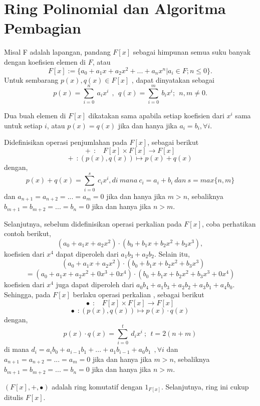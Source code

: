 \chapter{Ring Polinomial dan Algoritma Pembagian}
	Misal F adalah lapangan, pandang $F[x]$ sebagai himpunan semua suku banyak dengan koefisien elemen di $F$, atau
		$$ F[x]	:= \big\{ a_0 + a_1x + a_2x^2 + ... + a_nx^n | a_i \in F; n \le 0 \big\}. $$
	Untuk sembarang $ p(x), q(x) \in F[x]$ , dapat dinyatakan sebagai
	$$ p(x) = \sum^{n}_{i=0} \ a_ix^i ~~,~~q(x) = \sum^{m}_{i=0} \ b_ix^i   ;~~   n,m \ne 0. $$
\par Dua buah elemen di $F[x]$ dikatakan sama apabila setiap koefisien dari $x^i$ sama untuk setiap $i$, atau $p(x) = q(x)$ jika dan hanya jika $a_i = b_i , \forall i$.
\par 	Didefinisikan operasi penjumlahan pada $F[x]$, sebagai berikut
	$$ +	~~:~~~~F[x] \times F[x] \longrightarrow F[x]$$
	$$ + ~~:(p(x),q(x)) \mapsto p(x) + q(x)$$
	dengan, $$p(x) + q(x) = \sum^{s}_{i=0} \ c_ix^i , di~mana~ c_i = a_i + b_i ~dan~ s =max\{n,m\}$$
	dan $a_{n+1} = a_{n+2} = ... = a_m = 0 $ jika dan hanya jika $m>n$, sebaliknya $b_{m+1} = b_{m+2} = ... = b_n = 0 $ jika dan hanya jika $n>m$.
\par 	Selanjutnya, sebelum didefinisikan operasi perkalian pada $F[x]$, coba perhatikan contoh berikut,
	 $$(a_0+a_1x+a_2x^2) \cdot (b_0+b_1x+b_2x^2+b_3x^3),$$
	koefisien dari $x^4$ dapat diperoleh dari $a_1b_3 + a_2b_2$.  Selain itu,
	$$~~~~(a_0+a_1x+a_2x^2) \cdot (b_0+b_1x+b_2x^2+b_3x^3)$$
	$$=(a_0+a_1x+a_2x^2 + 0x^3+0x^4) \cdot (b_0+b_1x+b_2x^2+b_3x^3+0x^4)$$
	koefisien dari $x^4$ juga dapat diperoleh dari $a_0b_4+a_1b_3+a_2b_2+a_3b_1+a_4b_0$.
	\\ Sehingga, pada $F[x]$ berlaku operasi perkalian , sebagai berikut
	$$ \bullet	~~:~~~~ F[x] \times F[x] \longrightarrow F[x]$$
	$$ \bullet ~~:(p(x),q(x)) \mapsto p(x)\cdot q(x)$$
	dengan, $$p(x) \cdot q(x) = \sum^{t}_{i=0} \ d_ix^i~;~~ t= 2(n+m)$$
	di mana $d_i = a_ib_0 + a_{i-1}b_1+...+a_1b_{i-1}+a_0b_1~~,\forall i$ 
	dan $a_{n+1} = a_{n+2} = ... = a_m = 0$ jika dan hanya jika $m>n$, sebaliknya $b_{m+1} = b_{m+2} = ... = b_n = 0 $ jika dan hanya jika $n>m$.
	
\par 	$(F[x], + , \bullet)$ adalah ring komutatif dengan $1_{F[x]}$. Selanjutnya, ring ini cukup ditulis $F[x]$.
	
